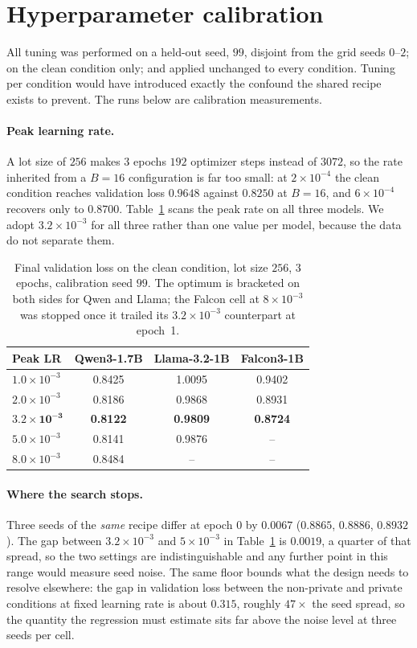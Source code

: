 \section{\label{apx:calib}Hyperparameter calibration}
All tuning was performed on a held-out seed,
$99$,
disjoint from the grid seeds $0$--$2$;
on the clean condition only;
and applied unchanged to every condition.
Tuning per condition would have introduced exactly the confound the shared recipe exists to prevent.
The runs below are calibration measurements.

\paragraph{Peak learning rate.}
A lot size of $256$ makes $3$ epochs $192$ optimizer steps instead of $3072$,
so the rate inherited from a $B{=}16$ configuration is far too small:
at $2\times10^{-4}$ the clean condition reaches validation loss $0.9648$ against $0.8250$ at $B{=}16$,
and $6\times10^{-4}$ recovers only to $0.8700$.
Table~\ref{tab:lr} scans the peak rate on all three models.
We adopt $3.2\times10^{-3}$ for all three rather than one value per model,
because the data do not separate them.

\begin{table}[h]
\centering
\begin{tabular}{@{}lccc@{}}
\toprule
Peak LR & Qwen3-1.7B & Llama-3.2-1B & Falcon3-1B \\
\midrule
$1.0\times10^{-3}$ & 0.8425 & 1.0095 & 0.9402 \\
$2.0\times10^{-3}$ & 0.8186 & 0.9868 & 0.8931 \\
$\mathbf{3.2\times10^{-3}}$ & \textbf{0.8122} & \textbf{0.9809} & \textbf{0.8724} \\
$5.0\times10^{-3}$ & 0.8141 & 0.9876 & -- \\
$8.0\times10^{-3}$ & 0.8484 & -- & -- \\
\bottomrule
\end{tabular}
\caption{Final validation loss on the clean condition,
lot size $256$,
$3$ epochs,
calibration seed $99$.
The optimum is bracketed on both sides for Qwen and Llama;
the Falcon cell at $8\times10^{-3}$ was stopped once it trailed its $3.2\times10^{-3}$ counterpart at epoch~1.}
\label{tab:lr}
\end{table}

\paragraph{Where the search stops.}
Three seeds of the \textit{same} recipe differ at epoch $0$ by $0.0067$ ($0.8865$, $0.8886$, $0.8932$).
The gap between $3.2\times10^{-3}$ and $5\times10^{-3}$ in Table~\ref{tab:lr} is $0.0019$,
a quarter of that spread,
so the two settings are indistinguishable and any further point in this range would measure seed noise.
The same floor bounds what the design needs to resolve elsewhere:
the gap in validation loss between the non-private and private conditions at fixed learning rate is about $0.315$,
roughly $47\times$ the seed spread,
so the quantity the regression must estimate sits far above the noise level at three seeds per cell.

